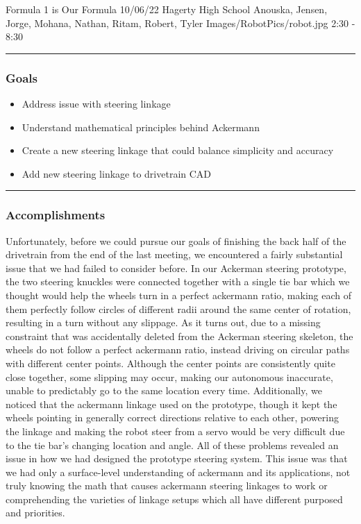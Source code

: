 \insertmeeting 
	{Formula 1 is Our Formula} 
	{10/06/22} 
	{Hagerty High School}
	{Anouska, Jensen, Jorge, Mohana, Nathan, Ritam, Robert, Tyler}
	{Images/RobotPics/robot.jpg}
	{2:30 - 8:30}
	
\noindent\hfil\rule{\textwidth}{.4pt}\hfil
\subsubsection*{Goals}
\begin{itemize}
    \item Address issue with steering linkage
    \item Understand mathematical principles behind Ackermann
    \item Create a new steering linkage that could balance simplicity and accuracy
    \item Add new steering linkage to drivetrain CAD

\end{itemize} 

\noindent\hfil\rule{\textwidth}{.4pt}\hfil

\subsubsection*{Accomplishments}
Unfortunately, before we could pursue our goals of finishing the back half of the drivetrain from the end of the last meeting, we encountered a fairly substantial issue that we had failed to consider before. In our Ackerman steering prototype, the two steering knuckles were connected together with a single tie bar which we thought would help the wheels turn in a perfect ackermann ratio, making each of them perfectly follow circles of different radii around the same center of rotation, resulting in a turn without any slippage. As it turns out, due to a missing constraint that was accidentally deleted from the Ackerman steering skeleton, the wheels do not follow a perfect ackermann ratio, instead driving on circular paths with different center points. Although the center points are consistently quite close together, some slipping may occur, making our autonomous inaccurate, unable to predictably go to the same location every time. Additionally, we noticed that the ackermann linkage used on the prototype, though it kept the wheels pointing in generally correct directions relative to each other, powering the linkage and making the robot steer from a servo would be very difficult due to the tie bar’s changing location and angle. All of these problems revealed an issue in how we had designed the prototype steering system. This issue was that we had only a surface-level understanding of ackermann and its applications, not truly knowing the math that causes ackermann steering linkages to work or comprehending the varieties of linkage setups which all have different purposed and priorities. 

